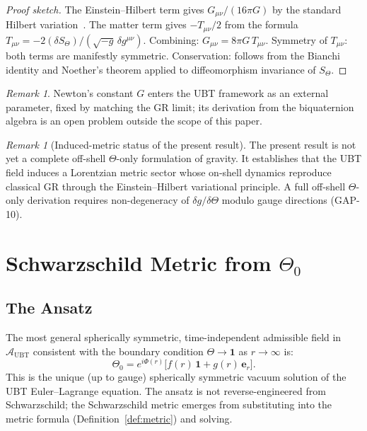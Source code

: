 \documentclass[12pt,a4paper]{article}
\theoremstyle{definition}
\theoremstyle{remark}
\newtheorem{remark}[theorem]{Remark}
\newcommand{\calA}{\mathcal{A}}
\begin{document}
\begin{proof}[Proof sketch]
The Einstein--Hilbert term gives $G_{\mu\nu}/(16\pi G)$ by the standard
Hilbert variation~\cite{hilbert1915,wald1984}.
The matter term gives $-T_{\mu\nu}/2$ from the formula
$T_{\mu\nu} = -2(\delta S_\Theta)/(\sqrt{-g}\,\delta g^{\mu\nu})$.
Combining: $G_{\mu\nu} = 8\pi G\,T_{\mu\nu}$.
Symmetry of $T_{\mu\nu}$: both terms are manifestly symmetric.
Conservation: follows from the Bianchi identity and Noether's theorem applied
to diffeomorphism invariance of $S_\Theta$.
\end{proof}

\begin{remark}
Newton's constant $G$ enters the UBT framework as an external parameter,
fixed by matching the GR limit; its derivation from the biquaternion algebra
is an open problem outside the scope of this paper.
\end{remark}

\begin{remark}[Induced-metric status of the present result]
The present result is not yet a complete off-shell $\Theta$-only formulation of
gravity. It establishes that the UBT field induces a Lorentzian metric sector
whose on-shell dynamics reproduce classical GR through the Einstein--Hilbert
variational principle. A full off-shell $\Theta$-only derivation requires
non-degeneracy of $\delta g/\delta\Theta$ modulo gauge directions (GAP-10).
\end{remark}

\section{Schwarzschild Metric from $\Theta_0$}
\label{sec:schwarzschild}

\subsection{The Ansatz}

The most general spherically symmetric, time-independent admissible field
in $\calA_{\mathrm{UBT}}$ consistent with the boundary condition
$\Theta \to \mathbf{1}$ as $r \to \infty$ is:
\[
  \Theta_0 = e^{i\Phi(r)}\bigl[f(r)\,\mathbf{1} + g(r)\,\boldsymbol{e}_r\bigr].
\]
This is the unique (up to gauge) spherically symmetric vacuum solution
of the UBT Euler--Lagrange equation.
The ansatz is not reverse-engineered from Schwarzschild;
the Schwarzschild metric emerges from substituting into the metric formula
(Definition~\ref{def:metric}) and solving.
\end{document}
